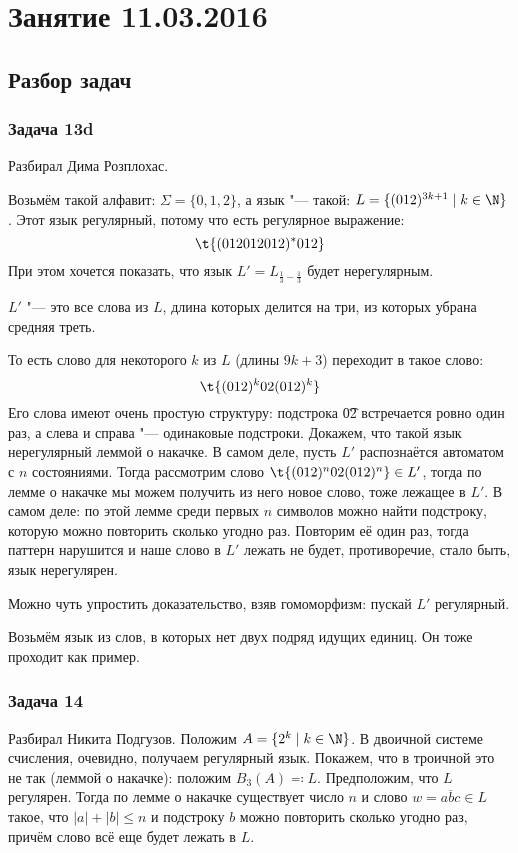 \chapter{Занятие 11.03.2016}
\section{Разбор задач}

\subsection{Задача 13d}
	Разбирал Дима Розплохас.

	Возьмём такой алфавит: $\Sigma=\{0,1,2\}$,
	а язык "--- такой: $L = \{(012)^{3k+1} \mid k \in \N \}$.
	Этот язык регулярный, потому что есть регулярное выражение:
	\[ \t{(012012012)^*012} \]
	При этом хочется показать, что язык $L'=L_{\frac13-\frac13}$ будет нерегулярным.
	\begin{Rem}
		$L'$ "--- это все слова из $L$, длина которых делится на три, из которых убрана средняя треть.
	\end{Rem}
	То есть слово для некоторого $k$ из $L$ (длины $9k+3$) переходит в такое слово:
	\[ \t{(012)^k02(012)^k} \]
	Его слова имеют очень простую структуру: подстрока \t{02} встречается ровно один раз,
	а слева и справа "--- одинаковые подстроки.
	Докажем, что такой язык нерегулярный леммой о накачке.
	В самом деле, пусть $L'$ распознаётся автоматом с $n$ состояниями.
	Тогда рассмотрим слово $\t{(012)^n02(012)^n} \in L'$, тогда по лемме о накачке мы можем
	получить из него новое слово, тоже лежащее в $L'$.
	В самом деле: по этой лемме среди первых $n$ символов можно найти подстроку,
	которую можно повторить сколько угодно раз.
	Повторим её один раз, тогда паттерн нарушится и наше слово в $L'$ лежать не будет,
	противоречие, стало быть, язык нерегулярен.

	\begin{Rem}
		Можно чуть упростить доказательство, взяв гомоморфизм:
		пускай $L'$ регулярный.
		\TODO
	\end{Rem}

	\begin{Rem}
		Возьмём язык из слов, в которых нет двух подряд идущих единиц.
		Он тоже проходит как пример.
	\end{Rem}

\subsection{Задача 14}
	Разбирал Никита Подгузов.
	Положим $A = \{ 2^k \mid k \in \N \}$.
	В двоичной системе счисления, очевидно, получаем регулярный язык.
	Покажем, что в троичной это не так (леммой о накачке): положим $B_3(A) \eqcolon L$.
	Предположим, что $L$ регулярен.
	Тогда по лемме о накачке существует число $n$ и слово $w=\overline{abc} \in L$ такое, что $|a|+|b| \le n$
	и подстроку $b$ можно повторить сколько угодно раз, причём слово всё еще будет лежать в $L$.

